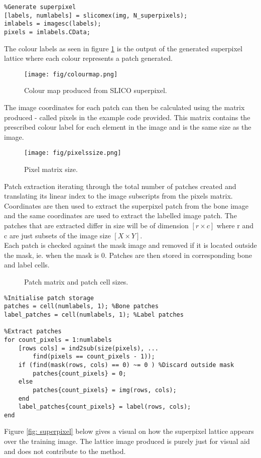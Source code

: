 \begin{lstlisting}
%Generate superpixel
[labels, numlabels] = slicomex(img, N_superpixels);
imlabels = imagesc(labels);
pixels = imlabels.CData;
\end{lstlisting}
\bigskip

The colour labels as seen in figure \ref{fig:colourmap} is the output of the generated superpixel lattice where each colour represents a patch generated. 

\begin{figure}[H]
\centering
\texttt{[image: fig/colourmap.png]}
\caption{Colour map produced from SLICO superpixel.}
\label{fig:colourmap}
\end{figure}

The image coordinates for each patch can then be calculated using the matrix produced - called pixels in the example code provided. This matrix contains the prescribed colour label for each element in the image and is the same size as the image.

\begin{figure}[H]
\centering
\texttt{[image: fig/pixelssize.png]}
\caption{Pixel matrix size.}
\label{mat: pixel}
\end{figure}


Patch extraction iterating through the total number of patches created and translating its linear index to the image subscripts from the pixels matrix. Coordinates are then used to extract the superpixel patch from the bone image and the same coordinates are used to extract the labelled image patch. The patches that are extracted differ in size will be of dimension $[r \times c]$ where r and c are just subsets of the image size $[X \times Y]$.
\\[1\baselineskip]
Each patch is checked against the mask image and removed if it is located outside the mask, ie. when the mask is 0. Patches are then stored in corresponding bone and label cells.

\begin{figure}[H]
    \centering
    \qquad
    \caption{Patch matrix and patch cell sizes.}%
    \label{mat:patch_cell}
\end{figure}


\begin{lstlisting}
%Initialise patch storage
patches = cell(numlabels, 1); %Bone patches
label_patches = cell(numlabels, 1); %Label patches

%Extract patches
for count_pixels = 1:numlabels
    [rows cols] = ind2sub(size(pixels), ...
        find(pixels == count_pixels - 1));
    if (find(mask(rows, cols) == 0) ~= 0 ) %Discard outside mask
        patches{count_pixels} = 0; 
    else
        patches{count_pixels} = img(rows, cols);
    end
    label_patches{count_pixels} = label(rows, cols);
end
\end{lstlisting} 
\bigskip
Figure \ref{fig: superpixel} below gives a visual on how the superpixel lattice appears over the training image. The lattice image produced is purely just for visual aid and does not contribute to the method. 

